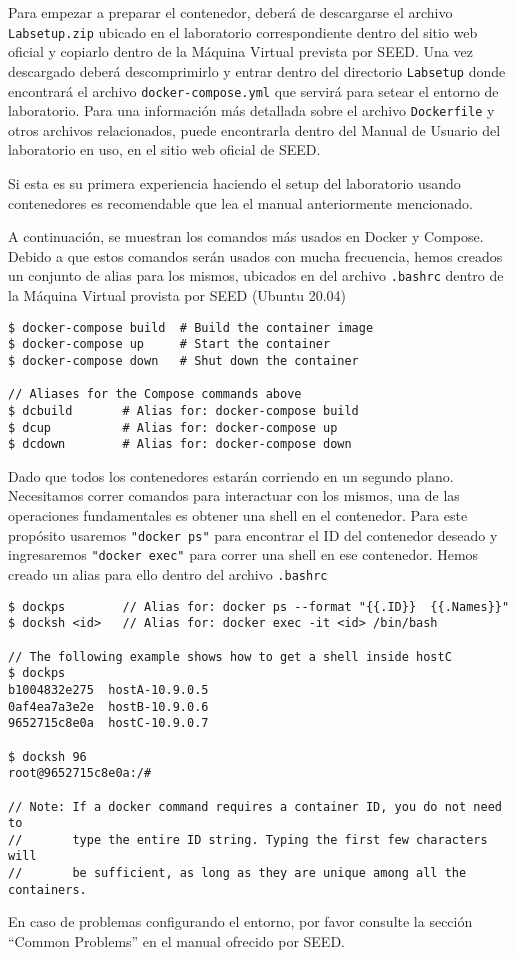Para empezar a preparar el contenedor, deberá de descargarse el archivo \texttt{Labsetup.zip} ubicado en el laboratorio correspondiente dentro del sitio web oficial y copiarlo dentro de la Máquina Virtual prevista por SEED. Una vez descargado deberá descomprimirlo y entrar dentro del directorio \texttt{Labsetup} donde encontrará el archivo \texttt{docker-compose.yml} que servirá para setear el entorno de laboratorio. Para una información más detallada sobre el archivo \texttt{Dockerfile} y otros archivos relacionados, puede encontrarla dentro del Manual de Usuario del laboratorio en uso, en el sitio web oficial de SEED.

Si esta es su primera experiencia haciendo el setup del laboratorio usando contenedores es recomendable que lea el manual anteriormente mencionado.

A continuación, se muestran los comandos más usados en Docker y Compose.
Debido a que estos comandos serán usados con mucha frecuencia, hemos creados un conjunto de alias para los mismos, ubicados en del archivo \texttt{.bashrc} dentro de la Máquina Virtual provista por SEED (Ubuntu 20.04)

\begin{lstlisting}
$ docker-compose build  # Build the container image
$ docker-compose up     # Start the container
$ docker-compose down   # Shut down the container

// Aliases for the Compose commands above
$ dcbuild       # Alias for: docker-compose build
$ dcup          # Alias for: docker-compose up
$ dcdown        # Alias for: docker-compose down
\end{lstlisting}


Dado que todos los contenedores estarán corriendo en un segundo plano. Necesitamos correr comandos para interactuar con los mismos, una de las operaciones fundamentales es obtener una shell en el contenedor. 
Para este propósito usaremos \texttt{"docker ps"} para encontrar el ID del contenedor deseado y ingresaremos \texttt{"docker exec"} para correr una shell en ese contenedor.
Hemos creado un alias para ello dentro del archivo \texttt{.bashrc}

\begin{lstlisting}
$ dockps        // Alias for: docker ps --format "{{.ID}}  {{.Names}}" 
$ docksh <id>   // Alias for: docker exec -it <id> /bin/bash

// The following example shows how to get a shell inside hostC
$ dockps
b1004832e275  hostA-10.9.0.5
0af4ea7a3e2e  hostB-10.9.0.6
9652715c8e0a  hostC-10.9.0.7

$ docksh 96
root@9652715c8e0a:/#  

// Note: If a docker command requires a container ID, you do not need to 
//       type the entire ID string. Typing the first few characters will 
//       be sufficient, as long as they are unique among all the containers. 
\end{lstlisting}

En caso de problemas configurando el entorno, por favor consulte la sección ``Common Problems'' en el manual ofrecido por SEED. 

